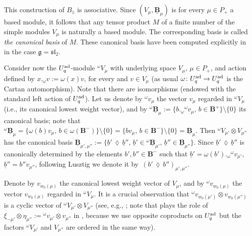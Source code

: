 \documentclass[10pt,a4paper]{amsart}
\numberwithin{equation}{section}
\theoremstyle{definition}
\newcommand{\ra}{\rightarrow}
\begin{document}
This construction of $B_{\lozenge}$ is associative. Since $(V_\mu, \underline{\mathbf{B}}_{\mu})$ is for every $\mu\in P_+$ a based module, it follows that any tensor product $M$ of a finite number of the simple modules $V_\mu$ is naturally a based module. The corresponding basis is called {\it the canonical basis} of $M$. These canonical basis have been computed explicitly in \cite{FK} in the case $\mathfrak{g}={\mathfrak{sl}_2}$.

Consider now the $U_q^{\rm ad}$-module ${}^{\omega}V_{\mu}$ with underlying space $V_{\mu}$, $\mu\in P_+$, and action defined by $x._{\omega} v := \omega(x)v$, for every  and $v\in V_{\mu}$ (as usual $\omega\colon U_q^{\rm ad} \ra U_q^{\rm ad}$ is the Cartan automorphism). Note that there are isomorphisms  (endowed with the standard left action of $U_q^{\rm ad}$). Let us denote by ${}^\omega v_\mu$ the vector $v_\mu$ regarded in ${}^{\omega}V_{\mu}$ (i.e., its canonical lowest weight vector), and by ${}^\omega\underline{\mathbf{B}}_{\mu}:=\{b._{\omega}{}^\omega v_{\mu},\, b\in \mathbf{B}^+\}\setminus \{0\}$ its canonical basis; note that ${}^\omega\underline{\mathbf{B}}_{\mu} = \{\omega(b){}v_{\mu},\, b\in \omega(\mathbf{B}^-)\}\setminus \{0\} = \{b v_{\mu},\, b\in \mathbf{B}^-\}\setminus \{0\} = \underline{\mathbf{B}}_{\mu}$. Then ${}^{\omega}V_{\mu'}\otimes V_{\mu''}$ has the canonical basis $\underline{\mathbf{B}}_{\mu',\mu''} := \{\underline{b}'\,\lozenge\, \underline{b}'', \, \underline{b}'\in {}^\omega\underline{\mathbf{B}}_{\mu'},\, \underline{b}''\in \underline{\mathbf{B}}_{\mu''}\}$. Since $\underline{b}'\,\lozenge\, \underline{b}''$ is canonically determined by the elements $b' ,b''\in \mathbf{B}^-$ such that $\underline{b}' = \omega(b')._{\omega} {}^\omega v_{\mu'}$, $\underline{b}'' = b''v_{\mu''}$, following Lusztig we denote it by~${(b' \,\lozenge\, b'')_{\mu',\mu''}}$.

 Denote by $v_{w_0(\mu)}$ the canonical lowest weight vector of $V_{\mu}$, and by ${}^\omega v_{w_0(\mu)}$ the vector $v_{w_0(\mu)}$ regarded in ${}^{\omega}V_{\mu}$. It is a crucial observation that ${}^\omega v_{w_0(\mu')}\otimes v_{w_0(\mu'')}$ is a cyclic vector of ${}^{\omega}V_{\mu'}\otimes V_{\mu''}$ (see, e.g., \cite[Proposition~23.3.6]{Lusztig}; note that  plays the role of $\xi_{-\mu'}\otimes \eta_{\mu''}:= {}^\omega v_{\mu'}\otimes v_{\mu''}$ in \cite{Lusztig}, because we use opposite coproducts on $U_q^{\rm ad}$ but the factors ${}^{\omega}V_{\mu'}$ and $V_{\mu''}$ are ordered in the same way).
\end{document}
